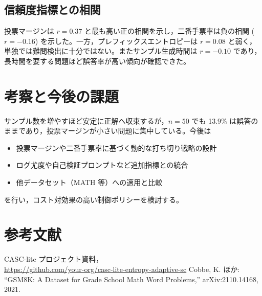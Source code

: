 \documentclass{ipsj}
\begin{document}
\subsection{信頼度指標との相関}
投票マージンは $r=0.37$ と最も高い正の相関を示し，二番手票率は負の相関 ($r=-0.16$) を示した。一方，プレフィックスエントロピーは $r=0.08$ と弱く，単独では難問検出に十分ではない。またサンプル生成時間は $r=-0.10$ であり，長時間を要する問題ほど誤答率が高い傾向が確認できた。

\section{考察と今後の課題}
サンプル数を増やすほど安定に正解へ収束するが，$n=50$ でも 13.9\% は誤答のままであり，投票マージンが小さい問題に集中している。今後は
\begin{itemize}
  \item 投票マージンや二番手票率に基づく動的な打ち切り戦略の設計
  \item ログ尤度や自己検証プロンプトなど追加指標との統合
  \item 他データセット（MATH 等）への適用と比較
\end{itemize}
を行い，コスト対効果の高い制御ポリシーを検討する。

\section*{参考文献}
\begin{thebibliography}{9}
 CASC-lite プロジェクト資料，\\ \url{https://github.com/your-org/casc-lite-entropy-adaptive-sc}
 Cobbe, K. ほか: ``GSM8K: A Dataset for Grade School Math Word Problems,'' arXiv:2110.14168, 2021.
\end{thebibliography}
\end{document}
